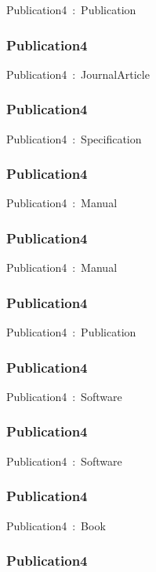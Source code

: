 \documentclass{article}
\begin{document}
Publication4~:~Publication

\subsubsection*{Publication4}

Publication4~:~JournalArticle

\subsubsection*{Publication4}

Publication4~:~Specification

\subsubsection*{Publication4}

Publication4~:~Manual

\subsubsection*{Publication4}

Publication4~:~Manual

\subsubsection*{Publication4}

Publication4~:~Publication

\subsubsection*{Publication4}

Publication4~:~Software

\subsubsection*{Publication4}

Publication4~:~Software

\subsubsection*{Publication4}

Publication4~:~Book

\subsubsection*{Publication4}
\end{document}
